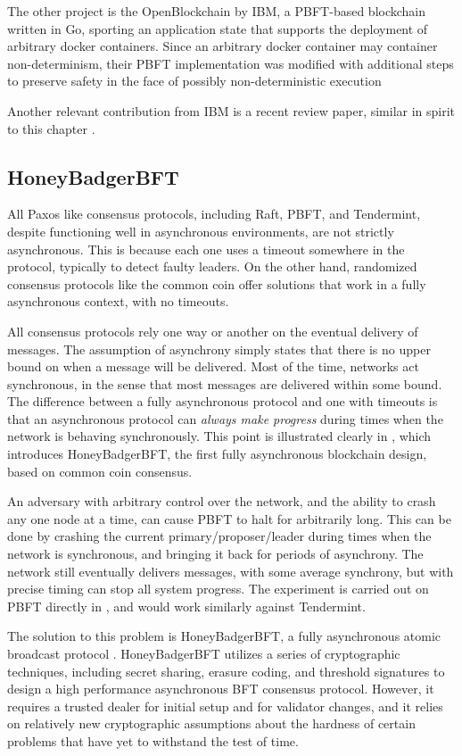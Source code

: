 The other project is the OpenBlockchain by IBM, a PBFT-based blockchain written in Go,
sporting an application state that supports the deployment of arbitrary docker containers.
Since an arbitrary docker container may container non-determinism, their PBFT implementation
was modified with additional steps to preserve safety in the face of possibly non-deterministic execution \cite{cachin2016non}

Another relevant contribution from IBM is a recent review paper, similar in spirit to this chapter \cite{vukolic11quest}.

\subsection{HoneyBadgerBFT}

All Paxos like consensus protocols, including Raft, PBFT, and Tendermint, 
despite functioning well in asynchronous environments, are not strictly asynchronous.
This is because each one uses a timeout somewhere in the protocol, typically to detect faulty leaders.
On the other hand, randomized consensus protocols like the common coin offer solutions that work in 
a fully asynchronous context, with no timeouts.

All consensus protocols rely one way or another on the eventual delivery of messages.
The assumption of asynchrony simply states that there is no upper bound on when a message will be delivered.
Most of the time, networks act synchronous, in the sense that most messages are delivered within some bound.
The difference between a fully asynchronous protocol and one with timeouts is that 
an asynchronous protocol can \emph{always make progress} during times when the network is behaving synchronously.
This point is illustrated clearly in \cite{honeybadger}, which introduces HoneyBadgerBFT, 
the first fully asynchronous blockchain design, based on common coin consensus.

An adversary with arbitrary control over the network, 
and the ability to crash any one node at a time,
can cause PBFT to halt for arbitrarily long.
This can be done by crashing the current primary/proposer/leader during times when the network is synchronous,
and bringing it back for periods of asynchrony.
The network still eventually delivers messages, with some average synchrony,
but with precise timing can stop all system progress.
The experiment is carried out on PBFT directly in \cite{honeybadger}, and would work similarly against Tendermint.

The solution to this problem is HoneyBadgerBFT, a fully asynchronous atomic broadcast protocol \cite{honeybadger}.
HoneyBadgerBFT utilizes a series of cryptographic techniques, including secret sharing, erasure coding, 
and threshold signatures to design a high performance asynchronous BFT consensus protocol.
However, it requires a trusted dealer for initial setup and for validator changes, 
and it relies on relatively new cryptographic assumptions about the hardness of certain problems that have 
yet to withstand the test of time.

